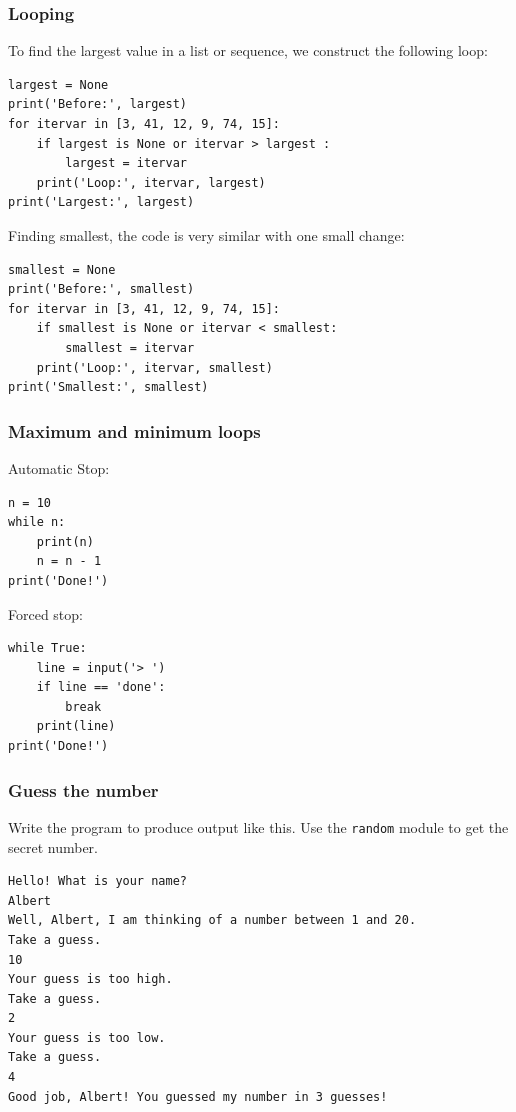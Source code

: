 \begin{frame}[fragile]\frametitle{Looping}
To find the largest value in a list or sequence, we construct the following loop:
\begin{lstlisting}
largest = None
print('Before:', largest)
for itervar in [3, 41, 12, 9, 74, 15]:
	if largest is None or itervar > largest :
		largest = itervar
	print('Loop:', itervar, largest)
print('Largest:', largest)
\end{lstlisting}
Finding smallest, the code is very similar with one small change:
\begin{lstlisting}
smallest = None
print('Before:', smallest)
for itervar in [3, 41, 12, 9, 74, 15]:
	if smallest is None or itervar < smallest:
		smallest = itervar
	print('Loop:', itervar, smallest)
print('Smallest:', smallest)
\end{lstlisting}
\end{frame}

\begin{frame}[fragile]\frametitle{Maximum and minimum loops}
Automatic Stop:
\begin{lstlisting}
n = 10
while n:
	print(n)
	n = n - 1
print('Done!')
\end{lstlisting}
Forced stop:
\begin{lstlisting}
while True:
	line = input('> ')
	if line == 'done':
		break
	print(line)
print('Done!')
\end{lstlisting}
\end{frame}

\begin{frame}[fragile]\frametitle{Guess the number}

Write the program to produce output like this. Use the \texttt{random} module to get the secret number.
\begin{lstlisting}
Hello! What is your name?
Albert
Well, Albert, I am thinking of a number between 1 and 20.
Take a guess.
10
Your guess is too high.
Take a guess.
2
Your guess is too low.
Take a guess.
4
Good job, Albert! You guessed my number in 3 guesses!
\end{lstlisting}
\end{frame}


